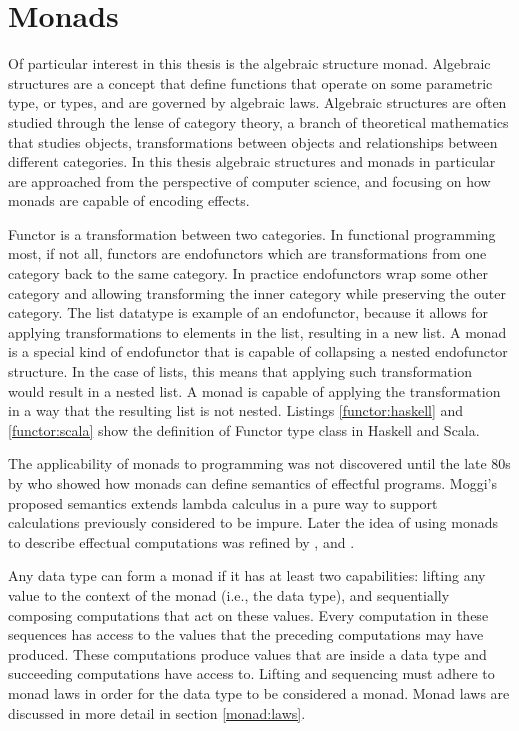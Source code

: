 


\section{Monads} \label{background:monads}
Of particular interest in this thesis is the algebraic structure monad. Algebraic structures are a concept that define functions that operate on some parametric type, or types, and are governed by algebraic laws. Algebraic structures are often studied through the lense of category theory, a branch of theoretical mathematics that studies objects, transformations between objects and relationships between different categories. In this thesis algebraic structures and monads in particular are approached from the perspective of computer science, and focusing on how monads are capable of encoding effects.

Functor is a transformation between two categories. In functional programming most, if not all, functors are endofunctors which are transformations from one category back to the same category. In practice endofunctors wrap some other category and allowing transforming the inner category while preserving the outer category. The list datatype is example of an endofunctor, because it allows for applying transformations to elements in the list, resulting in a new list. A monad is a special kind of endofunctor that is capable of collapsing a nested endofunctor structure. In the case of lists, this means that applying such transformation would result in a nested list. A monad is capable of applying the transformation in a way that the resulting list is not nested. Listings \ref{functor:haskell} and \ref{functor:scala} show the definition of Functor type class in Haskell and Scala.





The applicability of monads to programming was not discovered until the late 80s by \textcite{comp-lambda-monads} who showed how monads can define semantics of effectful programs. Moggi's proposed semantics extends lambda calculus in a pure way to support calculations previously considered to be impure. Later the idea of using monads to describe effectual computations was refined by \textcite{comprehending-monads}, \textcite{notions-computations} and \textcite{monads-for-fp}.

Any data type can form a monad if it has at least two capabilities: lifting any value to the context of the monad (i.e., the data type), and sequentially composing computations that act on these values. Every computation in these sequences has access to the values that the preceding computations may have produced. These computations produce values that are inside a data type and succeeding computations have access to. Lifting and sequencing must adhere to monad laws in order for the data type to be considered a monad. Monad laws are discussed in more detail in section \ref{monad:laws}.

